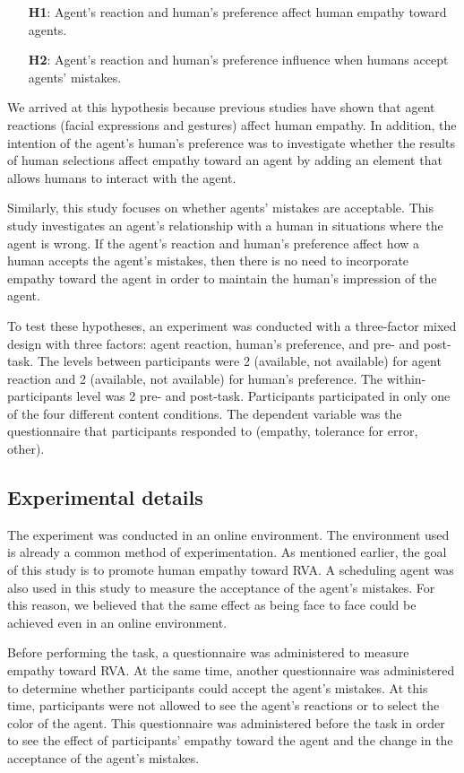 \documentclass[runningheads]{llncs}
\begin{document}
\begin{enumerate}
\item[\textbf{H1}:] Agent's reaction and human's preference affect human empathy toward agents.
\item[\textbf{H2}:] Agent's reaction and human's preference influence when humans accept agents' mistakes.
\end{enumerate}

We arrived at this hypothesis because previous studies have shown that agent reactions (facial expressions and gestures) affect human empathy.
In addition, the intention of the agent's human's preference was to investigate whether the results of human selections affect empathy toward an agent by adding an element that allows humans to interact with the agent.

Similarly, this study focuses on whether agents' mistakes are acceptable. 
This study investigates an agent's relationship with a human in situations where the agent is wrong. 
If the agent's reaction and human's preference affect how a human accepts the agent's mistakes, then there is no need to incorporate empathy toward the agent in order to maintain the human's impression of the agent.

To test these hypotheses, an experiment was conducted with a three-factor mixed design with three factors: agent reaction, human's preference, and pre- and post-task. 
The levels between participants were 2 (available, not available) for agent reaction and 2 (available, not available) for human's preference. 
The within-participants level was 2 pre- and post-task. 
Participants participated in only one of the four different content conditions. 
The dependent variable was the questionnaire that participants responded to (empathy, tolerance for error, other).

\subsection{Experimental details}
The experiment was conducted in an online environment. 
The environment used is already a common method of experimentation\cite{Davis99,Crump13,Okamura20}. 
As mentioned earlier, the goal of this study is to promote human empathy toward RVA. 
A scheduling agent was also used in this study to measure the acceptance of the agent's mistakes.
For this reason, we believed that the same effect as being face to face could be achieved even in an online environment.

Before performing the task, a questionnaire was administered to measure empathy toward RVA. 
At the same time, another questionnaire was administered to determine whether participants could accept the agent's mistakes. 
At this time, participants were not allowed to see the agent's reactions or to select the color of the agent. 
This questionnaire was administered before the task in order to see the effect of participants' empathy toward the agent and the change in the acceptance of the agent's mistakes.
\end{document}
